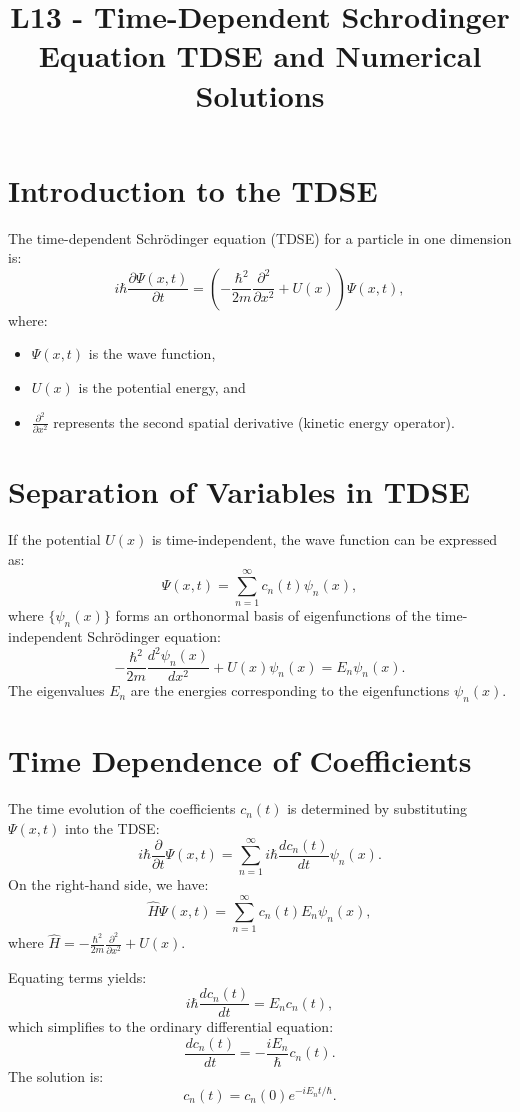 \documentclass[a4paper,12pt]{article}
\begin{document}
\title{L13 - Time-Dependent Schrodinger Equation TDSE and Numerical Solutions}
\author{}
\date{}
\maketitle
\begin{multicols}{2}

\section{Introduction to the TDSE}
The time-dependent Schrödinger equation (TDSE) for a particle in one dimension is:
\[
i \hbar \frac{\partial \Psi(x,t)}{\partial t} = \left(-\frac{\hbar^2}{2m} \frac{\partial^2}{\partial x^2} + U(x)\right)\Psi(x,t),
\]
where:
\begin{itemize}
\item $\Psi(x,t)$ is the wave function,
\item $U(x)$ is the potential energy, and
\item $\frac{\partial^2}{\partial x^2}$ represents the second spatial derivative (kinetic energy operator).
\end{itemize}

\section{Separation of Variables in TDSE}
If the potential $U(x)$ is time-independent, the wave function can be expressed as:
\[
\Psi(x,t) = \sum_{n=1}^\infty c_n(t)\psi_n(x),
\]
where $\{\psi_n(x)\}$ forms an orthonormal basis of eigenfunctions of the time-independent Schrödinger equation:
\[
-\frac{\hbar^2}{2m} \frac{d^2\psi_n(x)}{dx^2} + U(x)\psi_n(x) = E_n\psi_n(x).
\]
The eigenvalues $E_n$ are the energies corresponding to the eigenfunctions $\psi_n(x)$.


\section{Time Dependence of Coefficients}
The time evolution of the coefficients $c_n(t)$ is determined by substituting $\Psi(x,t)$ into the TDSE:
\[
i \hbar \frac{\partial}{\partial t} \Psi(x,t) = \sum_{n=1}^\infty i \hbar \frac{dc_n(t)}{dt} \psi_n(x).
\]
On the right-hand side, we have:
\[
\hat{H}\Psi(x,t) = \sum_{n=1}^\infty c_n(t)E_n\psi_n(x),
\]
where $\hat{H} = -\frac{\hbar^2}{2m} \frac{\partial^2}{\partial x^2} + U(x)$.

Equating terms yields:
\[
i \hbar \frac{dc_n(t)}{dt} = E_n c_n(t),
\]
which simplifies to the ordinary differential equation:
\[
\frac{dc_n(t)}{dt} = -\frac{i E_n}{\hbar} c_n(t).
\]
The solution is:
\[
c_n(t) = c_n(0)e^{-iE_n t/\hbar}.
\]


\end{multicols}
\end{document}

